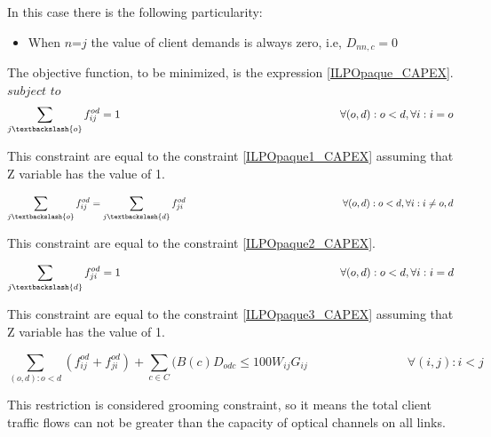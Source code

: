 \vspace{11pt}
In this case there is the following particularity:

\begin{itemize}
  \item When $n$=$j$ the value of client demands is always zero, i.e, $D_{nn,c}=0$
\end{itemize}


\vspace{17pt}
The objective function, to be minimized, is the expression \ref{ILPOpaque_CAPEX}.\\

$subject$ $to$
\begin{equation}
\sum_{j\textbackslash \{o\}} f_{ij}^{od} = 1  \qquad \qquad \qquad \qquad \qquad \qquad \qquad \qquad \qquad \qquad
\forall(o,d) : o < d, \forall i: i = o
\label{ILPOpaque1_Surv}
\end{equation}

This constraint are equal to the constraint \ref{ILPOpaque1_CAPEX} assuming that Z variable has the value of 1.

\begin{equation}
\sum_{j\textbackslash \{o\}} f_{ij}^{od} = \sum_{j\textbackslash \{d\}} f_{ji}^{od}   \qquad \qquad \qquad \qquad \qquad \qquad \qquad \qquad
\forall(o,d) : o < d, \forall i: i \neq o,d
\label{ILPOpaque2_Surv}
\end{equation}

This constraint are equal to the constraint \ref{ILPOpaque2_CAPEX}.

\begin{equation}
\sum_{j\textbackslash \{d\}} f_{ji}^{od} = 1  \qquad \qquad \qquad \qquad \qquad \qquad \qquad \qquad \qquad \qquad
\forall(o,d) : o < d, \forall i: i = d
\label{ILPOpaque3_Surv}
\end{equation}

This constraint are equal to the constraint \ref{ILPOpaque3_CAPEX} assuming that Z variable has the value of 1.

\begin{equation}
\sum_{(o,d):o<d} \left(f_{ij}^{od} + f_{ji}^{od}\right) + \sum_{c\in C} (B\left(c\right) D_{odc}\leq100 W_{ij} G_{ij} \qquad \qquad \qquad \qquad
\forall(i,j) : i < j
\label{ILPOpaque4_Surv}
\end{equation}

This restriction is considered grooming constraint, so it means the total client traffic flows can not be greater than the capacity of optical channels on all links.

